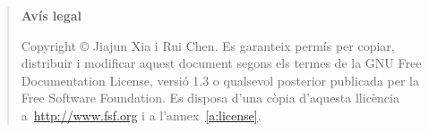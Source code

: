 \pagebreak

\vspace*{16truecm}

	\begin{quote}
	\textbf{Avís legal}

	  Copyright \copyright{}  Jiajun Xia i Rui Chen.
	  Es garanteix permís per copiar, distribuir i modificar aquest document segons els termes de la GNU Free Documentation License, versió 1.3 o qualsevol posterior publicada per la Free Software Foundation. Es disposa d'una còpia d'aquesta llicència a~\href{http://www.fsf.org}{http://www.fsf.org} i a l'annex~\ref{a:license}.
	\end{quote}





\endinput
